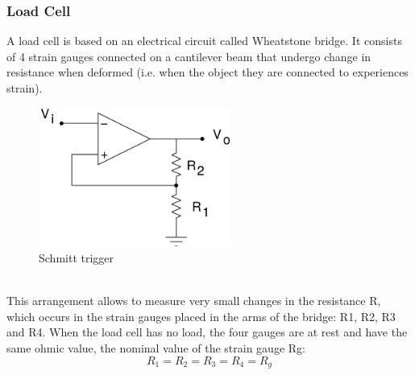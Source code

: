 \documentclass[12pt]{article}
\begin{document}
        \subsubsection{Load Cell}
            A load cell is based on an electrical circuit called Wheatstone bridge. It consists of 4 strain gauges connected on a cantilever beam that undergo change in resistance when deformed (i.e. when the object they are connected to experiences strain).
            \begin{figure}[H]
                \centering
                \includegraphics[width = 0.4\linewidth, height = 1.8in]{reports/lab2/non.png}
                \caption{Schmitt trigger}
            \end{figure}
            \\
            \noindent
            This arrangement allows to measure very small changes in the resistance R, which occurs in the strain gauges placed in the arms of the bridge: R1, R2, R3 and R4. When the load cell has no load, the four gauges are at rest and have the same ohmic value, the nominal value of the strain gauge Rg:
            \begin{equation}
                R_1 = R_2 = R_3 = R_4 = R_g 
            \end{equation}
\end{document}
